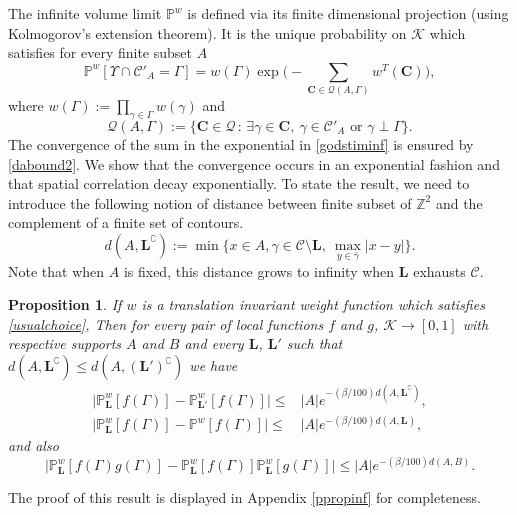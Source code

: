 \documentclass[JEP,XML,SOM,Unicode, NoFloatCountersInSection]{cedram}
\let\mathcal\mathscr
\newcommand{\sep}{\,:\,}
\numberwithin{equation}{section}
\theoremstyle{plain}
\newtheorem{proposition}[theorem]{Proposition}
\theoremstyle{definition}
\newcommand{\cc}{\complement}
\newcommand{\cQ}{{\ensuremath{\mathcal Q}} }
\newcommand{\cC}{{\ensuremath{\mathcal C}} }
\newcommand{\cK}{{\ensuremath{\mathcal K}} }
\newcommand{\bC}{{\ensuremath{\mathbf C}} }
\newcommand{\bL}{{\ensuremath{\mathbf L}} }
\newcommand{\bbP}{{\ensuremath{\mathbb P}} }
\newcommand{\bbZ}{{\ensuremath{\mathbb Z}} }
\newcommand{\gb}{\beta}
\newcommand{\gG}{\Gamma}
\begin{document}
The infinite volume limit $\bbP^w$ is defined via its finite dimensional projection (using Kolmogorov's extension theorem). It is the
unique probability on $\cK$ which satisfies for every finite subset $A$
\begin{equation}\label{godstiminf}
\bbP^w[\Upsilon \cap \cC'_{A}=\gG]=
w(\gG)\exp\biggl(-\sum_{\bC\in \cQ(A,\gG)} w^T(\bC)\biggr),
\end{equation}
where $w(\gG):=\prod_{\gamma\in \gG}w(\gamma)$ and
\begin{equation*}
\cQ(A,\gG):=\{\bC\in \cQ \sep \exists \gamma\in \bC, \ \gamma\in \cC'_A \text{ or } \gamma \perp \gG \}.
\end{equation*}
The convergence of the sum in the exponential in \eqref{godstiminf} is ensured by \eqref{dabound2}.
We show that the convergence occurs in an exponential fashion and that spatial correlation decay exponentially.
To state the result, we need to introduce the following notion of distance between finite subset of $\bbZ^2$
and the complement of a finite set of contours.
\begin{equation*}
d(A,\bL^{\cc}):= \min\{ x\in A, \gamma\in \cC\setminus \bL, \ \max_{y\in \bar \gamma} |x-y|\}.
\end{equation*}
Note that when $A$ is fixed, this distance grows to infinity when $\bL$ exhausts $\cC$.

\begin{proposition}\label{propinfi}
If $w$ is a translation invariant weight function which satisfies \eqref{usualchoice},
Then
for every pair of local functions $f$ and $g$, $\cK \to [0,1]$ with respective supports $A$ and $B$ and every $\bL$, $\bL'$ such that
$ d(A,\bL^\cc) \le d(A,(\bL')^\cc)$ we have
\begin{equation}\label{convergenz}
\begin{split}
\bigl| \bbP^w_{\bL}[f(\gG)]-\bbP^w_{\bL'}[f(\gG)]\bigr|\le &|A|e^{-(\gb/100)d(A,\bL^\cc)},\\
\bigl| \bbP^w_{\bL}[f(\gG)]-\bbP^w[f(\gG)]\bigr|\le &|A|e^{-(\gb/100)d(A,\bL)},
\end{split}
\end{equation}
and also
\begin{equation}\label{decayze}
\bigl|\bbP^w_{\bL}[f(\gG)g(\gG)]- \bbP^w_{\bL}[f(\gG)]\bbP^w_{\bL}[g(\gG)]\bigr|\le |A|e^{-(\gb/100)d(A,B)}.
\end{equation}
\end{proposition}

The proof of this result is displayed in Appendix \ref{ppropinf} for completeness.
\end{document}
